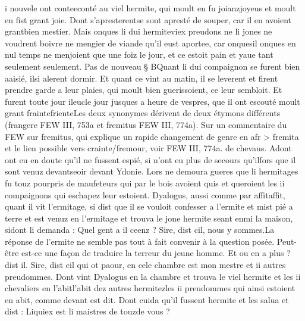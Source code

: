 \documentclass{article}
\begin{document}
\begin{pages}
                  i nouvele ont 
                  conteeconté au viel hermite, qui moult 
                  en fu 
                        joianzjoyeus et moult en fist grant joie. Dont 
                  s’apresterentse sont apresté de souper, car 
                  il en avoient 
                  grantbien mestier. Mais onques li 
                  dui hermiteviex preudons ne li jones ne voudrent boivre ne mengier de viande qu’il eust aportee, car 
                  onquesil onques en nul temps ne menjoient que une foiz le jour, et ce estoit pain et yaue 
                  tant seulement
                  seulement. \pend
            \pstart Pas de nouveau § BQuant
               li dui compaignon se furent bien aaisié, 
                  ilsi alerent dormir. Et quant ce vint au matin, il se leverent et firent prendre
               garde a leur plaies, qui moult bien guerissoient, ce leur sembloit. Et furent toute 
                  jour ileucle jour jusques a heure de vespres, que il ont escouté moult grant 
                  fraintefrienteLes deux synonymes dérivent de deux étymons
                  différents (frangere FEW III, 753a et fremitus FEW III, 774a). Sur un commentaire du FEW sur fremitus, qui
                  explique un rapide changement de genre en afr > fremita et le lien possible vers
                  crainte/fremour, voir FEW III, 774a. de chevaus. Adont ont eu en doute
               qu’il ne fussent espié, si n’ont eu plus de secours 
                  qu’ilfors que il sont venuz 
                  devantseoir devant
               Ydonie.
                  Lors ne demoura gueres que li
                  hermitages fu touz pourpris de maufeteurs qui par le bois avoient quis et
               queroient les ii compaignons qui eschapez leur estoient. Dyalogus, aussi comme 
                  par affitaffit, quant il vit l’ermitage, si
               dist que il se vouloit confesser a l’ermite et mist pié a terre et est
               venuz en l’ermitage et trouva le jone hermite seant enmi la
               maison, 
                  sidont li demanda : Quel gent a il ceenz ?
               Sire, dist cil, nous y sommes.La réponse de l'ermite ne semble pas tout à fait convenir à la
                  question posée. Peut-être est-ce une façon de traduire la terreur du jeune
                  homme.
               Et ou en a plus ? 
                     dist il.
               Sire, dist cil qui ot paour, en cele chambre est mon mestre et ii autres
                  preudommes. Dont vint Dyalogus en la
               chambre et trouva 
                  le viel hermite et les
                        ii chevaliers en 
                        l’abitl'abit dez autres hermitezles ii preudommes qui ainsi estoient en abit, 
                     comme devant est dit. Dont cuida qu’il fussent
                  hermite et les salua et dist : Liquiex est
                  li maistres 
                     de touzde vous ?
               

\end{pages}
\end{document}
